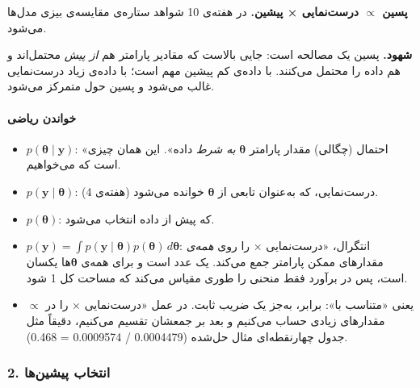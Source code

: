 \textbf{پسین \ensuremath{\propto} درست‌نمایی × پیشین.} در هفته‌ی 10 شواهد ستاره‌ی مقایسه‌ی بیزی
مدل‌ها می‌شود.

\textbf{شهود.} پسین یک مصالحه است: جایی بالاست که مقادیر پارامتر هم
\emph{از پیش} محتمل‌اند و هم داده را محتمل می‌کنند. با داده‌ی کم پیشین مهم
است؛ با داده‌ی زیاد درست‌نمایی غالب می‌شود و پسین حول  متمرکز
می‌شود.

\paragraph{خواندن ریاضی}

\begin{itemize}
\tightlist
\item
  \(p(\boldsymbol\theta \mid \mathbf{y})\): «احتمال (چگالی) مقدار
  پارامتر \(\boldsymbol\theta\) \emph{به شرط} داده». این همان چیزی است
  که می‌خواهیم.
\item
  \(p(\mathbf{y} \mid \boldsymbol\theta)\): درست‌نمایی، که به‌عنوان تابعی
  از \(\boldsymbol\theta\) خوانده می‌شود (هفته‌ی 4).
\item
  \(p(\boldsymbol\theta)\):  که پیش از داده انتخاب می‌شود.
\item
  \(p(\mathbf{y}) = \int p(\mathbf{y}\mid\boldsymbol\theta)p(\boldsymbol\theta)\,d\boldsymbol\theta\):
  انتگرال، «درست‌نمایی ×  را روی \emph{همه‌ی} مقدارهای ممکن
  پارامتر جمع می‌کند. یک عدد است و برای همه‌ی \(\boldsymbol\theta\)ها
  یکسان است، پس در برآورد فقط منحنی را طوری مقیاس می‌کند که مساحت کل 1
  شود.
\item
  \(\propto\) یعنی «متناسب با»: برابر، به‌جز یک ضریب ثابت. در عمل
  «درست‌نمایی ×  را در مقدارهای زیادی حساب می‌کنیم و بعد بر
  جمعشان تقسیم می‌کنیم، دقیقاً مثل جدول چهارنقطه‌ای مثال حل‌شده (0.0004479 /
  0.0009574 = 0.468).
\end{itemize}

\subsubsection{2. انتخاب پیشین‌ها}

